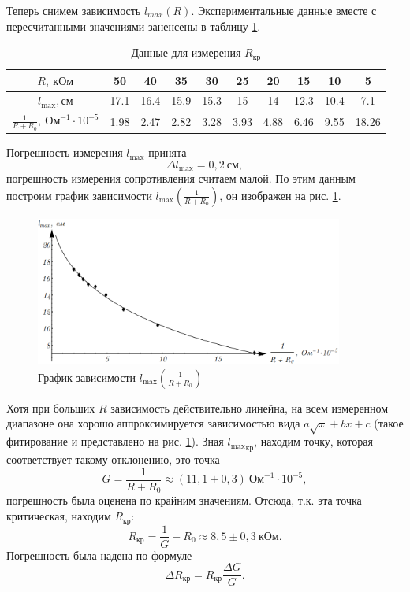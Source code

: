 \documentclass[12pt,a4paper]{article}
\begin{document}
Теперь снимем зависимость $l_{max}(R)$. Экспериментальные данные вместе с пересчитанными значениями заненсены в таблицу \ref{tab3}.
\begin{table}[ht]\centering
\begin{tabular}{|*{10}{c|}}
\hline
$R,~\text{кОм}$&50&40&35&30&25&20&15&10&5\\
\hline
$l_\text{max},\text{см}$&17.1&16.4&15.9&15.3&15&14&12.3&10.4&7.1\\
\hline
$\frac{1}{R + R_0},~\text{Ом}^{-1}\cdot10^{-5}$&1.98&2.47&2.82&3.28&3.93&4.88&6.46&9.55&18.26\\
\hline
\end{tabular}
\caption{Данные для измерения $R_\text{кр}$ \label{tab3}}
\end{table}

\noindent Погрешность измерения $l_\text{max}$ принята 
\begin{equation}
\Delta l_\text{max} = 0,2~\text{см},
\end{equation}
погрешность измерения сопротивления считаем малой.
По этим данным построим график зависимости $l_\text{max}\left(\frac{1}{R+R_0}\right)$, он изображен на рис. \ref{Fig6}.
\begin{figure}[ht]\centering
\includegraphics[width = 0.9\textwidth]{Plot3}
\captionsetup{justification = centering}
\caption{График зависимости $l_\text{max}\left(\frac{1}{R+R_0}\right)$\label{Fig6}} 
\end{figure}

Хотя при больших $R$ зависимость действительно линейна, на всем измеренном диапазоне она хорошо аппроксимируется зависимостью вида $a\sqrt{x} + bx + c$ (такое фитирование и представлено на рис. \ref{Fig6}). Зная ${l_\text{max}}_\text{кр}$, находим точку, которая соответствует такому отклонению, это точка
\begin{equation}
G = \frac{1}{R + R_0} \approx (11,1\pm0,3)~\text{Ом}^{-1}\cdot10^{-5},
\end{equation}
погрешность была оценена по крайним значениям. Отсюда, т.к. эта точка критическая, находим $R_\text{кр}$:
\begin{equation}
R_\text{кр} = \frac{1}{G} - R_0 \approx 8,5 \pm 0,3~\text{кОм}.
\end{equation}
Погрешность была надена по формуле
\begin{equation}
\Delta R_\text{кр} = R_\text{кр}\frac{\Delta G}{G}.
\end{equation}
\end{document}
